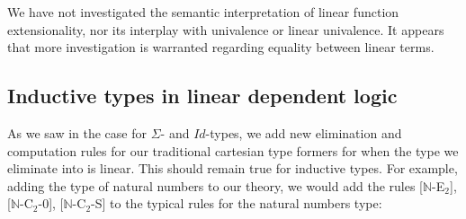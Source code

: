 \documentclass[a4paper,english]{lipics-v2018}
\begin{document}
  We have not investigated the semantic interpretation of linear function extensionality, nor its interplay with univalence or linear univalence. It appears that more investigation is warranted regarding equality between linear terms.
  \subsection{Inductive types in linear dependent logic}
  As we saw in the case for $\Sigma$- and $Id$-types, we add new elimination and computation rules for our traditional cartesian type formers for when the type we eliminate into is linear. This should remain true for inductive types. For example, adding the type of natural numbers to our theory, we would add the rules [$\mathbb{N}$-E$_2$], [$\mathbb{N}$-C$_2$-0], [$\mathbb{N}$-C$_2$-S] to the typical rules for the natural numbers type:\\
\end{document}
